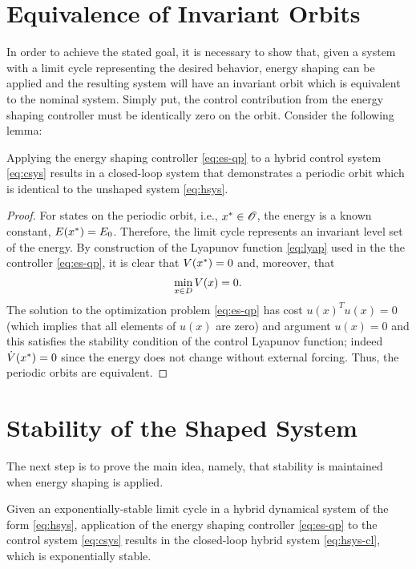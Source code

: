 \section*{Equivalence of Invariant Orbits}
In order to achieve the stated goal, it is necessary to show that, given a system with a limit cycle representing the desired behavior, energy shaping can be applied and the resulting system will have an invariant orbit which is equivalent to the nominal system. Simply put, the control contribution from the energy shaping controller must be identically zero on the orbit. Consider the following lemma:

\begin{lemma}
  Applying the energy shaping controller \eqref{eq:es-qp} to a hybrid control system \eqref{eq:csys} results in a closed-loop system that demonstrates a periodic orbit which is identical to the unshaped system \eqref{eq:hsys}.
\end{lemma}

\begin{proof}
  For states on the periodic orbit, i.e., $x^{*} \in \mathscr{O}$, the energy is a known constant, $E(x^{*}) = E_{0}$.
  Therefore, the limit cycle represents an invariant level set of the energy.
  By construction of the Lyapunov function \eqref{eq:lyap} used in the the controller \eqref{eq:es-qp}, it is clear that $V(x^{*}) = 0$ and, moreover, that $$\min_{x \in D} V(x) = 0.$$
  The solution to the optimization problem \eqref{eq:es-qp} has cost $u(x)^T u(x) = 0$ (which implies that all elements of $u(x)$ are zero) and argument $u(x) = 0$ and this satisfies the stability condition of the control Lyapunov function; indeed ${\dot V}(x^{*}) = 0$ since the energy does not change without external forcing.
  Thus, the periodic orbits are equivalent.
\end{proof}

\section*{Stability of the Shaped System}

The next step is to prove the main idea, namely, that stability is maintained when energy shaping is applied.

\begin{theorem}
  Given an exponentially-stable limit cycle in a hybrid dynamical system of the form \eqref{eq:hsys}, application of the energy shaping controller \eqref{eq:es-qp} to the control system \eqref{eq:csys} results in the closed-loop hybrid system \eqref{eq:hsys-cl}, which is exponentially stable.
\end{theorem}

